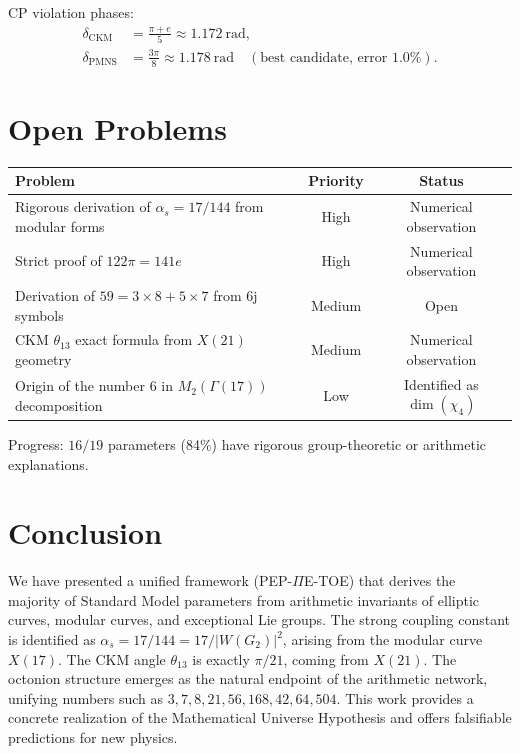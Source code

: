 ﻿\documentclass[11pt,a4paper]{article}
\theoremstyle{definition}
\begin{document}
CP violation phases:
\begin{align}
\delta_{\text{CKM}} &= \frac{\pi+e}{5} \approx 1.172\ \text{rad},\\
\delta_{\text{PMNS}} &= \frac{3\pi}{8} \approx 1.178\ \text{rad} \quad (\text{best candidate, error }1.0\%).
\end{align}

\section{Open Problems}

\begin{table}[h]
\centering
\begin{tabular}{@{}lcc@{}}
\toprule
\textbf{Problem} & \textbf{Priority} & \textbf{Status} \\
\midrule
Rigorous derivation of $\alpha_s = 17/144$ from modular forms & High & Numerical observation \\
Strict proof of $122\pi = 141e$ & High & Numerical observation \\
Derivation of $59 = 3\times8+5\times7$ from 6j symbols & Medium & Open \\
CKM $\theta_{13}$ exact formula from $X(21)$ geometry & Medium & Numerical observation \\
Origin of the number $6$ in $M_2(\Gamma(17))$ decomposition & Low & Identified as $\dim(\chi_4)$ \\
\bottomrule
\end{tabular}
\end{table}

Progress: $16/19$ parameters (84\%) have rigorous group-theoretic or arithmetic explanations.

\section{Conclusion}

We have presented a unified framework (PEP-$\Pi$E-TOE) that derives the majority of Standard Model parameters from arithmetic invariants of elliptic curves, modular curves, and exceptional Lie groups. The strong coupling constant is identified as $\alpha_s = 17/144 = 17/|W(G_2)|^2$, arising from the modular curve $X(17)$. The CKM angle $\theta_{13}$ is exactly $\pi/21$, coming from $X(21)$. The octonion structure emerges as the natural endpoint of the arithmetic network, unifying numbers such as $3,7,8,21,56,168,42,64,504$. This work provides a concrete realization of the Mathematical Universe Hypothesis and offers falsifiable predictions for new physics.
\end{document}
